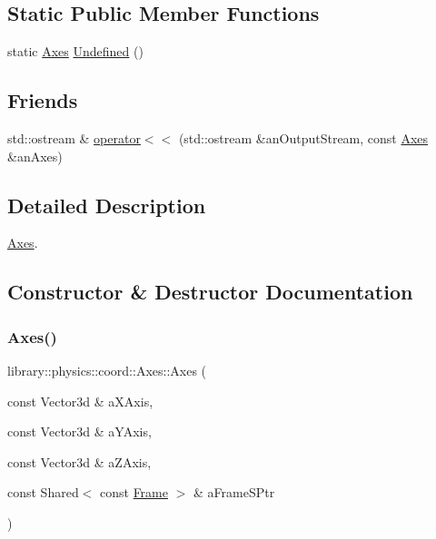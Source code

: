 \subsection*{Static Public Member Functions}
\begin{DoxyCompactItemize}
\item 
static \hyperlink{classlibrary_1_1physics_1_1coord_1_1_axes}{Axes} \hyperlink{classlibrary_1_1physics_1_1coord_1_1_axes_ab6ed449d3cdd757a42ba5f987c7d5778}{Undefined} ()
\end{DoxyCompactItemize}
\subsection*{Friends}
\begin{DoxyCompactItemize}
\item 
std\+::ostream \& \hyperlink{classlibrary_1_1physics_1_1coord_1_1_axes_a0ed7e604ae11f069877a8ee1a2d9b051}{operator$<$$<$} (std\+::ostream \&an\+Output\+Stream, const \hyperlink{classlibrary_1_1physics_1_1coord_1_1_axes}{Axes} \&an\+Axes)
\end{DoxyCompactItemize}


\subsection{Detailed Description}
\hyperlink{classlibrary_1_1physics_1_1coord_1_1_axes}{Axes}. 

\subsection{Constructor \& Destructor Documentation}
\mbox{\label{classlibrary_1_1physics_1_1coord_1_1_axes_a1af682b7f36ff1d594e6d93c56f7bf1d}} 
\subsubsection{\texorpdfstring{Axes()}{Axes()}}
{\footnotesize\ttfamily library\+::physics\+::coord\+::\+Axes\+::\+Axes (\begin{DoxyParamCaption}\item[{const Vector3d \&}]{a\+X\+Axis,  }\item[{const Vector3d \&}]{a\+Y\+Axis,  }\item[{const Vector3d \&}]{a\+Z\+Axis,  }\item[{const Shared$<$ const \hyperlink{classlibrary_1_1physics_1_1coord_1_1_frame}{Frame} $>$ \&}]{a\+Frame\+S\+Ptr }\end{DoxyParamCaption})}



